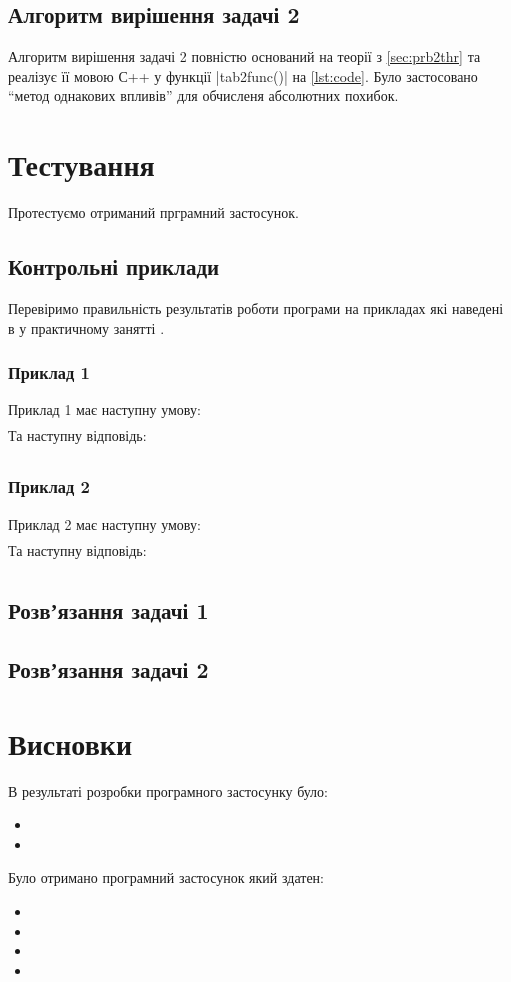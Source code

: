 \documentclass[../../../../document]{subfiles}
\begin{document}
	\section{Алгоритм вирішення задачі 2}
	Алгоритм вирішення задачі 2 повністю оснований на теорії з \cref{sec:prb2thr} та реалізує її мовою С++ у функції \cppinline|tab2func()| на \cref{lst:code}. Було застосовано \enquote{метод однакових впливів} для обчисленя абсолютних похибок.

	\FloatBarrier
	\chapter{Тестування}
	Протестуємо отриманий прграмний застосунок. 
	\section{Контрольні приклади}
	Перевіримо правильність результатів роботи програми на прикладах які наведені в \cite{computational_methods} у практичному занятті \prodnumber{}.
	\subsection{Приклад 1}
	Приклад 1 має наступну умову:
	\begin{gather}
	\end{gather}
	Та наступну відповідь:
	\begin{gather}
	\end{gather}

	\subsection{Приклад 2}
	Приклад 2 має наступну умову:
	\begin{gather}
	\end{gather}
	Та наступну відповідь:
	\begin{gather}
	\end{gather}
	
	\section{Розвʼязання задачі 1}

	\section{Розвʼязання задачі 2}

	\FloatBarrier
	\chapter{Висновки}
	В результаті розробки програмного застосунку було:
	\begin{itemize}
		\item
		\item
	\end{itemize}
	Було отримано програмний застосунок який здатен:
	\begin{itemize}
		\item
		\item
		\item
		\item
	\end{itemize}
\end{document}

